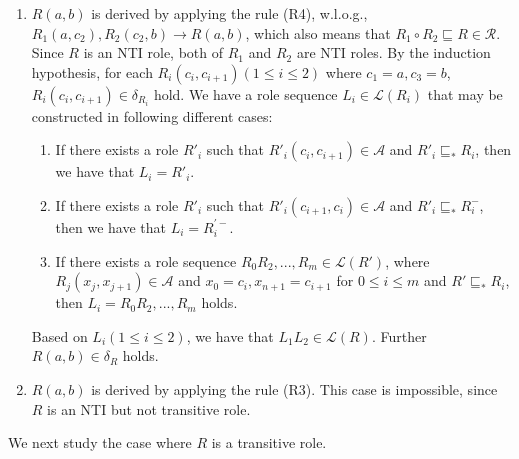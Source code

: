 \begin{enumerate}[leftmargin=12ex,label=Case~1.\arabic*, ref=Case~1.\arabic*]
\item $R(a,b)$ is derived by applying the rule (R4), w.l.o.g.,
    $R_1(a,c_2),R_2(c_2,b)\rightarrow R(a,b)$,
    which also means that $R_1\circ R_2\sqsubseteq R\in\mathcal{R}$.
    Since $R$ is an NTI role, both of $R_1$ and $R_2$ are NTI roles. By the induction hypothesis,
    for each $R_i(c_i,c_{i+1})(1\leq i\leq 2)$ where $c_1=a, c_3=b$, $R_i(c_i,c_{i+1})\in\delta_{R_i}$
    hold. We have a role sequence $L_i\in\mathcal{L}(R_i)$ that may be constructed in following different cases:

    \begin{enumerate}[leftmargin=14ex,label=Case~1.3.\arabic*]
    \item If there exists a role $R'_i$ such that $R'_i(c_i,c_{i+1})\in\mathcal{A}$
        and $R'_i\sqsubseteq_* R_i$, then we have that $L_i=R'_i$.

    \item If there exists a role $R'_i$ such that $R'_i(c_{i+1},c_{i})\in\mathcal{A}$
        and $R'_i\sqsubseteq_* R_i^-$, then we have that $L_i=R^{'-}_i$.

    \item If there exists a role sequence $R_0R_2,...,R_m\in\mathcal{L}(R')$, where $R_j(x_j,x_{j+1})\in\mathcal{A}$ and $x_0=c_i, x_{n+1}=c_{i+1}$ for $0\leq i\leq m$
        and $R'\sqsubseteq_* R_i$, then $L_i=R_0R_2,...,R_m$ holds.
    \end{enumerate}

    Based on $L_i(1\leq i\leq 2)$, we have that $L_1L_2\in\mathcal{L}(R)$. Further $R(a,b)\in\delta_R$
    holds.\label{dhlplus:NTIcaseR4}

\item $R(a,b)$ is derived by applying the rule (R3). This case is impossible,
    since $R$ is an NTI but not transitive role.
\end{enumerate}

We next study the case where $R$ is a transitive role.

